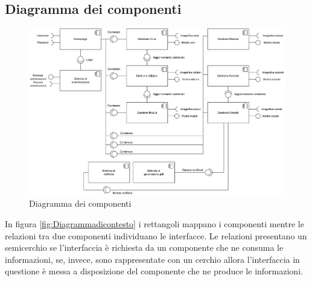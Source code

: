\subsection{Diagramma dei componenti}
\begin{figure}[h]
\centering
\includegraphics[scale=0.55]{img/Diagramma dei componenti.jpg}
\caption{Diagramma dei componenti}
\label{fig:Diagrammadeicomponenti}
\end{figure}
\noindent
In figura \ref{fig:Diagrammadicontesto} i rettangoli mappano i componenti mentre le relazioni tra due componenti individuano le interfacce. Le relazioni presentano un semicerchio se l'interfaccia è richiesta da un componente che ne consuma le informazioni, se, invece, sono rappresentate con un cerchio allora l'interfaccia in questione è messa a disposizione del componente che ne produce le informazioni.